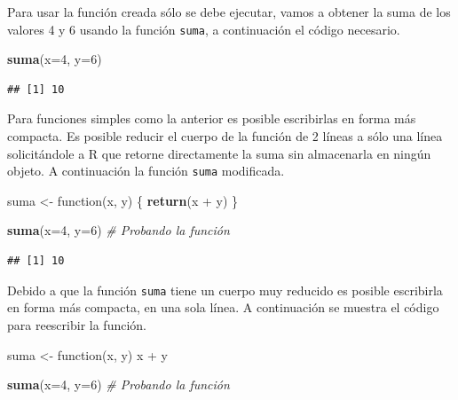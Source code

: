 \documentclass[10pt,]{krantz}
\makeatletter
\newenvironment{Shaded}{\begin{snugshade}}{\end{snugshade}}
\newcommand{\KeywordTok}[1]{\textcolor[rgb]{0.13,0.29,0.53}{\textbf{{#1}}}}
\newcommand{\DataTypeTok}[1]{\textcolor[rgb]{0.13,0.29,0.53}{{#1}}}
\newcommand{\DecValTok}[1]{\textcolor[rgb]{0.00,0.00,0.81}{{#1}}}
\newcommand{\StringTok}[1]{\textcolor[rgb]{0.31,0.60,0.02}{{#1}}}
\newcommand{\CommentTok}[1]{\textcolor[rgb]{0.56,0.35,0.01}{\textit{{#1}}}}
\newcommand{\NormalTok}[1]{{#1}}
\let\proglang=\textsf
\newenvironment{kframe}{%
\medskip{}
\setlength{\fboxsep}{.8em}
 \def\at@end@of@kframe{}%
 \ifinner\ifhmode%
  \def\at@end@of@kframe{\end{minipage}}%
  \begin{minipage}{\columnwidth}%
 \fi\fi%
 \def\FrameCommand##1{\hskip\@totalleftmargin \hskip-\fboxsep
 \colorbox{shadecolor}{##1}\hskip-\fboxsep
     \hskip-\linewidth \hskip-\@totalleftmargin \hskip\columnwidth}%
 \MakeFramed {\advance\hsize-\width
   \@totalleftmargin\z@ \linewidth\hsize
   \@setminipage}}%
 {\par\unskip\endMakeFramed%
 \at@end@of@kframe}
\renewenvironment{Shaded}{\begin{kframe}}{\end{kframe}}
\makeatother
\begin{document}
Para usar la función creada sólo se debe ejecutar, vamos a obtener la
suma de los valores 4 y 6 usando la función \texttt{suma}, a
continuación el código necesario.

\begin{Shaded}
\begin{Highlighting}[]
\KeywordTok{suma}\NormalTok{(}\DataTypeTok{x=}\DecValTok{4}\NormalTok{, }\DataTypeTok{y=}\DecValTok{6}\NormalTok{)}
\end{Highlighting}
\end{Shaded}

\begin{verbatim}
## [1] 10
\end{verbatim}

Para funciones simples como la anterior es posible escribirlas en forma
más compacta. Es posible reducir el cuerpo de la función de 2 líneas a
sólo una línea solicitándole a \proglang{R} que retorne directamente la
suma sin almacenarla en ningún objeto. A continuación la función
\texttt{suma} modificada.

\begin{Shaded}
\begin{Highlighting}[]
\NormalTok{suma <-}\StringTok{ }\NormalTok{function(x, y) \{}
  \KeywordTok{return}\NormalTok{(x +}\StringTok{ }\NormalTok{y)}
\NormalTok{\}}

\KeywordTok{suma}\NormalTok{(}\DataTypeTok{x=}\DecValTok{4}\NormalTok{, }\DataTypeTok{y=}\DecValTok{6}\NormalTok{)  }\CommentTok{# Probando la función}
\end{Highlighting}
\end{Shaded}

\begin{verbatim}
## [1] 10
\end{verbatim}

Debido a que la función \texttt{suma} tiene un cuerpo muy reducido es
posible escribirla en forma más compacta, en una sola línea. A
continuación se muestra el código para reescribir la función.

\begin{Shaded}
\begin{Highlighting}[]
\NormalTok{suma <-}\StringTok{ }\NormalTok{function(x, y) x +}\StringTok{ }\NormalTok{y}

\KeywordTok{suma}\NormalTok{(}\DataTypeTok{x=}\DecValTok{4}\NormalTok{, }\DataTypeTok{y=}\DecValTok{6}\NormalTok{)  }\CommentTok{# Probando la función}
\end{Highlighting}
\end{Shaded}
\end{document}
